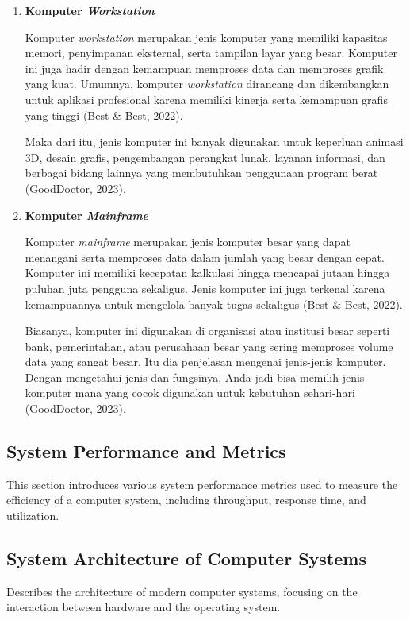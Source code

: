\documentclass[12pt]{article}
\begin{document}
\begin{enumerate}
    \item \textbf{Komputer \textit{Workstation}}

    \hspace{0.61cm}Komputer \textit{workstation} merupakan jenis komputer yang memiliki kapasitas memori, penyimpanan eksternal, serta tampilan layar yang besar. Komputer ini juga hadir dengan kemampuan memproses data dan memproses grafik yang kuat. Umumnya, komputer \textit{workstation} dirancang dan dikembangkan untuk aplikasi profesional karena memiliki kinerja serta kemampuan grafis yang tinggi (Best & Best, 2022). 

    \hspace{0.61cm}Maka dari itu, jenis komputer ini banyak digunakan untuk keperluan animasi 3D, desain grafis, pengembangan perangkat lunak, layanan informasi, dan berbagai bidang lainnya yang membutuhkan penggunaan program berat (GoodDoctor, 2023). 

    \item \textbf{Komputer \textit{Mainframe}}

    \hspace{0.61cm}Komputer \textit{mainframe} merupakan jenis komputer besar yang dapat menangani serta memproses data dalam jumlah yang besar dengan cepat. Komputer ini memiliki kecepatan kalkulasi hingga mencapai jutaan hingga puluhan juta pengguna sekaligus. Jenis komputer ini juga terkenal karena kemampuannya untuk mengelola banyak tugas sekaligus (Best & Best, 2022). 

    \hspace{0.61cm}Biasanya, komputer ini digunakan di organisasi atau institusi besar seperti bank, pemerintahan, atau perusahaan besar yang sering memproses volume data yang sangat besar. Itu dia penjelasan mengenai jenis-jenis komputer. Dengan mengetahui jenis dan fungsinya, Anda jadi bisa memilih jenis komputer mana yang cocok digunakan untuk kebutuhan sehari-hari (GoodDoctor, 2023).
    
\end{enumerate}

\subsection{System Performance and Metrics}
This section introduces various system performance metrics used to measure the efficiency of a computer system, including throughput, response time, and utilization.

\subsection{System Architecture of Computer Systems}
Describes the architecture of modern computer systems, focusing on the interaction between hardware and the operating system.
\end{document}
